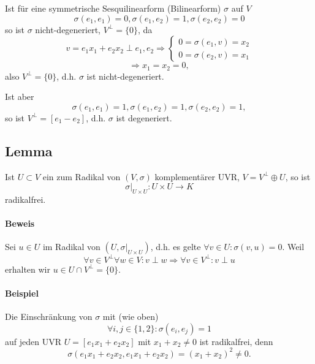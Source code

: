 	Ist für eine symmetrische Sesquilinearform (Bilinearform) $ \sigma $ auf $ V $
		\[ \sigma(e_1,e_1) = 0, \sigma(e_1,e_2) = 1, \sigma(e_2,e_2) = 0 \]
	so ist $ \sigma $ nicht-degeneriert, $ V^\perp = \{0\} $, da
		\[ v = e_1x_1 + e_2x_2 \perp e_1,e_2 \Rightarrow
		\begin{cases}
		0 = \sigma(e_1,v) = x_2\\
		0 = \sigma(e_2,v) = x_1
		\end{cases} \]
		\[ \Rightarrow x_1 = x_2 = 0, \]
	also $ V^\perp = \{0\} $, d.h. $ \sigma $ ist nicht-degeneriert.
	
	
	Ist aber
		\[ \sigma(e_1,e_1) = 1, \sigma(e_1,e_2) = 1, \sigma(e_2,e_2) = 1, \]
	so ist $ V^\perp = [e_1-e_2] $, d.h. $ \sigma $ ist degeneriert.
	

\subsection{Lemma}
\begin{Lemma}[]
	Ist $ U\subset V $ ein zum Radikal von $ (V,\sigma) $ komplementärer UVR, $ V = V^\perp \oplus U $, so ist
		\[ \sigma\big|_{U\times U}:U\times U \to K \]
	radikalfrei.
\end{Lemma}
\paragraph{Beweis}
	Sei $ u\in U $ im Radikal von $ (U,\sigma\big|_{U\times U}) $, d.h. es gelte $ \forall v\in U: \sigma(v,u) = 0 $.
	Weil
		\[ \forall v\in V^\perp\forall w\in V: v\perp w \Rightarrow \forall v\in V^\perp: v\perp u \]
	erhalten wir $ u\in U\cap V^\perp = \{0\} $.
\paragraph{Beispiel}
	Die Einschränkung von $ \sigma $ mit (wie oben)
		\[ \forall i,j \in \{1,2\}: \sigma(e_i,e_j) = 1 \]
	auf jeden UVR $ U = [e_1x_1 + e_2x_2] $ mit $ x_1 + x_2 \neq 0 $ ist radikalfrei, denn
			\[ \sigma(e_1x_1+e_2x_2, e_1x_1+e_2x_2) = (x_1+x_2)^2 \neq 0. \]
	